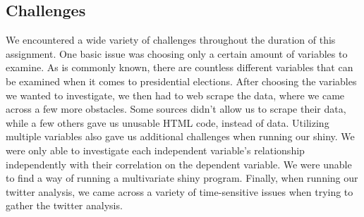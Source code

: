 \documentclass{article}
\begin{document}
{%

\subsection{Challenges}
%
%
We encountered a wide variety of challenges throughout the duration of this assignment. One basic issue was choosing only a certain amount of variables to examine. As is commonly known, there are countless different variables that can be examined when it comes to presidential elections. After choosing the variables we wanted to investigate, we then had to web scrape the data, where we came across a few more obstacles. Some sources didn't allow us to scrape their data, while a few others gave us unusable HTML code, instead of data. Utilizing multiple variables also gave us additional challenges when running our shiny. We were only able to investigate each independent variable's relationship independently with their correlation on the dependent variable. We were unable to find a way of running a multivariate shiny program. Finally, when running our twitter analysis, we came across a variety of time-sensitive issues when trying to gather the twitter analysis. 

}
\end{document}
